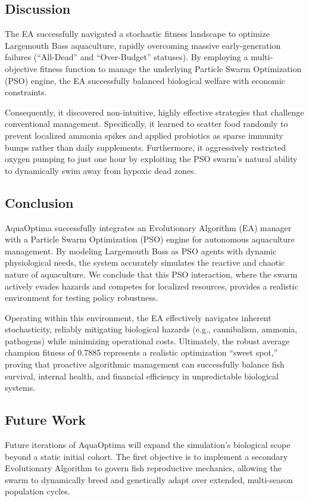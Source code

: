\documentclass[conference]{IEEEtran}
\begin{document}
\subsection{Discussion}
The EA successfully navigated a stochastic fitness landscape to optimize Largemouth Bass aquaculture, rapidly overcoming massive early-generation failures (``All-Dead'' and ``Over-Budget'' statuses). By employing a multi-objective fitness function to manage the underlying Particle Swarm Optimization (PSO) engine, the EA successfully balanced biological welfare with economic constraints.

Consequently, it discovered non-intuitive, highly effective strategies that challenge conventional management. Specifically, it learned to scatter food randomly to prevent localized ammonia spikes and applied probiotics as sparse immunity bumps rather than daily supplements. Furthermore, it aggressively restricted oxygen pumping to just one hour by exploiting the PSO swarm's natural ability to dynamically swim away from hypoxic dead zones.

\subsection{Conclusion}
AquaOptima successfully integrates an Evolutionary Algorithm (EA) manager with a Particle Swarm Optimization (PSO) engine for autonomous aquaculture management. By modeling Largemouth Bass as PSO agents with dynamic physiological needs, the system accurately simulates the reactive and chaotic nature of aquaculture. We conclude that this PSO interaction, where the swarm actively evades hazards and competes for localized resources, provides a realistic environment for testing policy robustness.

Operating within this environment, the EA effectively navigates inherent stochasticity, reliably mitigating biological hazards (e.g., cannibalism, ammonia, pathogens) while minimizing operational costs. Ultimately, the robust average champion fitness of 0.7885 represents a realistic optimization ``sweet spot,'' proving that proactive algorithmic management can successfully balance fish survival, internal health, and financial efficiency in unpredictable biological systems.

\subsection{Future Work}
Future iterations of AquaOptima will expand the simulation's biological scope beyond a static initial cohort. The first objective is to implement a secondary Evolutionary Algorithm to govern fish reproductive mechanics, allowing the swarm to dynamically breed and genetically adapt over extended, multi-season population cycles.
\end{document}
